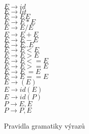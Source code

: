 \begin{figure}
$ E \rightarrow id $ \\
$ E \rightarrow	lit $ \\
$ E \rightarrow E ^{} E $ \\
$ E \rightarrow	E * E $ \\
$ E \rightarrow	E / E $ \\
$ E \rightarrow E + E $ \\
$ E \rightarrow	E - E $ \\
$ E \rightarrow	E .. E $ \\
$ E \rightarrow	E < E $ \\
$ E \rightarrow	E > E $ \\
$ E \rightarrow	E <= E $ \\
$ E \rightarrow	E >= E $ \\
$ E \rightarrow	E ~= E $ \\
$ E \rightarrow	E == E $ \\
$ E \rightarrow	( E ) $ \\
$ E \rightarrow	id ( E ) $ \\
$ E \rightarrow	id ( P ) $ \\
$ P \rightarrow E, E $ \\
$ P \rightarrow	P, E $ \\
\caption{Pravidla gramatiky výrazů}
\end{figure}
